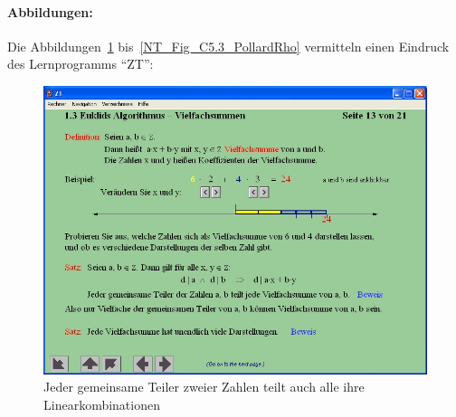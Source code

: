 \begin{refsegment}
\paragraph*{Abbildungen:}
Die Abbildungen~\ref{NT_Fig_C1.3_EuclidsAlg-LinearCombinations}
bis~\ref{NT_Fig_C5.3_PollardRho} vermitteln einen Eindruck des
Lernprogramms "`ZT"':


%
%
\begin{figure}[ht]
\begin{center}
\includegraphics[scale=0.4]{figures/NT_Fig_C1-3_EuclidsAlg-LinearCombinations}
\caption{Jeder gemeinsame Teiler zweier Zahlen teilt auch alle ihre Linearkombinationen}
\label{NT_Fig_C1.3_EuclidsAlg-LinearCombinations}
\end{center}
\end{figure}



\end{refsegment}

